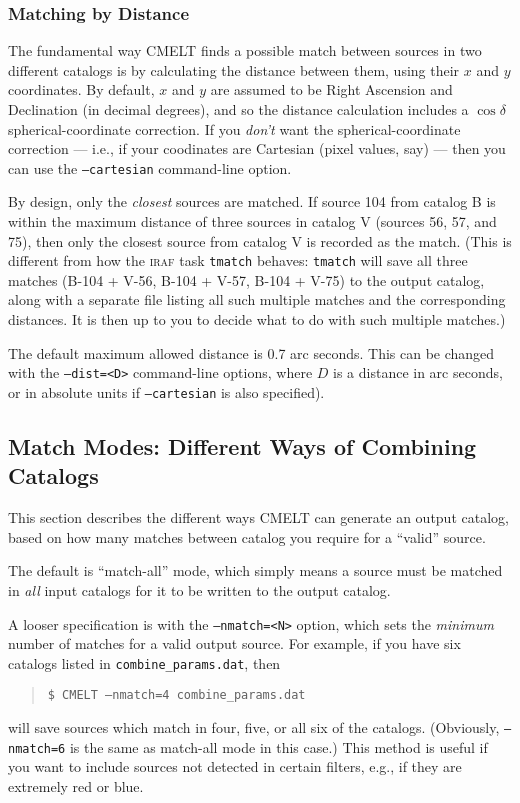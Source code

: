 \documentclass[10pt]{article}
\begin{document}
\subsubsection{Matching by Distance}

The fundamental way CMELT finds a possible match between sources in
two different catalogs is by calculating the distance between them,
using their $x$ and $y$ coordinates.  By default, $x$ and $y$ are
assumed to be Right Ascension and Declination (in decimal degrees),
and so the distance calculation includes a $\cos \delta$
spherical-coordinate correction.  If you \textit{don't} want the
spherical-coordinate correction --- i.e., if your coodinates are
Cartesian (pixel values, say) --- then you can use the
\texttt{--cartesian} command-line option.

By design, only the \textit{closest} sources are matched.  If source
104 from catalog B is within the maximum distance of three sources in
catalog V (sources 56, 57, and 75), then only the closest source from
catalog V is recorded as the match.  (This is different from how the
\textsc{iraf} task \texttt{tmatch} behaves: \texttt{tmatch} will save
all three matches (B-104 + V-56, B-104 + V-57, B-104 + V-75) to the
output catalog, along with a separate file listing all such multiple
matches and the corresponding distances.  It is then up to you to
decide what to do with such multiple matches.)

The default maximum allowed distance is 0.7 arc seconds.  This can be
changed with the \texttt{--dist=<D>} command-line options, where $D$
is a distance in arc seconds, or in absolute units if
\texttt{--cartesian} is also specified).



\subsection{Match Modes: Different Ways of Combining Catalogs}
\label{sec:modes}

This section describes the different ways CMELT can generate an 
output catalog, based on how many matches between catalog you require 
for a ``valid'' source.

The default is ``match-all'' mode, which simply means a source must be 
matched in \textit{all} input catalogs for it to be written to the 
output catalog.

A looser specification is with the \texttt{--nmatch=<N>} option, 
which sets the \textit{minimum} number of matches for a valid output 
source.  For example, if you have six catalogs listed in 
\texttt{combine\_params.dat}, then
\begin{quote}
  \texttt{\$ CMELT~--nmatch=4~combine\_params.dat}
\end{quote}
will save sources which match in four, five, or all six of the 
catalogs.  (Obviously, \texttt{--nmatch=6} is the same as match-all 
mode in this case.)  This method is useful if you want to include 
sources not detected in certain filters, e.g., if they are extremely 
red or blue.
\end{document}
